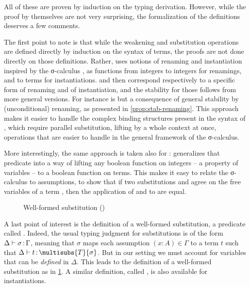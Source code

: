 All of these are proven by induction on the typing derivation.
However, while the proof by themselves are not very surprising, the formalization of the definitions
deserves a few comments.

The first point to note is that while the weakening and substitution operations are defined
directly by induction on the syntax of terms, the proofs are not done directly
on those definitions. Rather,  uses notions of renaming and instantiation inspired
by the σ-calculus , as functions from integers to integers for
renamings, and to terms for instantiations.
 and  then correspond respectively to a specific form of
renaming and of instantiation, and the stability for those follows from
more general versions. For instance  is but a consequence of general stability by
(unconditional) renaming, as presented in \cref{prop:stab-renaming}.
This approach makes it easier to handle the complex binding structures
present in the syntax of , which require parallel substitution, lifting by a whole context
at once, operations that are easier to handle in the general framework of the σ-calculus.

More interestingly, the same approach is taken also for :
 generalizes that predicate into a way of lifting
any boolean function on integers – a property of variables – to a boolean function
on terms.
This makes it easy to relate the σ-calculus
to  assumptions, \eg to show that if two substitutions  and 
agree on the free variables of a term , then the application of  and 
to  are equal.

\begin{figure}[h]
  \caption{Well-formed substitution ()}
  \label{fig:meta-subslet}
\end{figure}

A last point of interest is the definition of a well-formed substitution, a predicate called
.
Indeed, the usual typing judgment for substitutions
is of the form $\Delta \vdash \sigma \operatorname{\mathrel{:}} \Gamma$, meaning that
$\sigma$ maps each assumption $(x : A) \in \Gamma$ to a term $t$ such that
$\Delta \vdash t \ty \multisubs{T}{\sigma}$. But in our setting we must account for variables
that can be \emph{defined} in $\Delta$. This leads to the definition of a well-formed substitution as in \cref{fig:meta-subslet}.
A similar definition, called , is also available for
instantiations.

